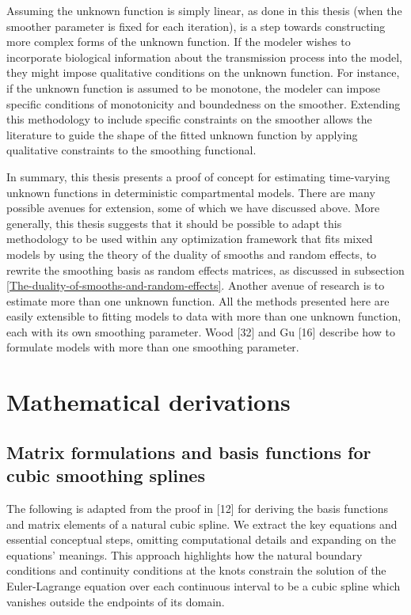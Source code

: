 \documentclass[
11pt, %
oneside, %
english, %
singlespacing, %
]{macthesis} %
\begin{document}
Assuming the unknown function is simply linear, as done in this thesis (when the smoother parameter is fixed for each iteration), is a step towards constructing more complex forms of the unknown function. If the modeler wishes to incorporate biological information about the transmission process into the model, they might impose qualitative conditions on the unknown function. For instance, if the unknown function is assumed to be monotone, the modeler can impose specific conditions of monotonicity and boundedness on the smoother. Extending this methodology to include specific constraints on the smoother allows the literature to guide the shape of the fitted unknown function by applying qualitative constraints to the smoothing functional.

In summary, this thesis presents a proof of concept for estimating time-varying unknown functions in deterministic compartmental models. There are many possible avenues for extension, some of which we have discussed above. More generally, this thesis suggests that it should be possible to adapt this methodology to be used within any optimization framework that fits mixed models by using the theory of the duality of smooths and random effects, to rewrite the smoothing basis as random effects matrices, as discussed in subsection \ref{The-duality-of-smooths-and-random-effects}. Another avenue of research is to estimate more than one unknown function. All the methods presented here are easily extensible to fitting models to data with more than one unknown function, each with its own smoothing parameter. Wood {[}32{]} and Gu {[}16{]} describe how to formulate models with more than one smoothing parameter.

\appendix

\chapter{Mathematical derivations}\label{Appendix}

\section{Matrix formulations and basis functions for cubic smoothing splines}\label{A1}

The following is adapted from the proof in {[}12{]} for deriving the basis functions and matrix elements of a natural cubic spline. We extract the key equations and essential conceptual steps, omitting computational details and expanding on the equations' meanings. This approach highlights how the natural boundary conditions and continuity conditions at the knots constrain the solution of the Euler-Lagrange equation over each continuous interval to be a cubic spline which vanishes outside the endpoints of its domain.
\end{document}
